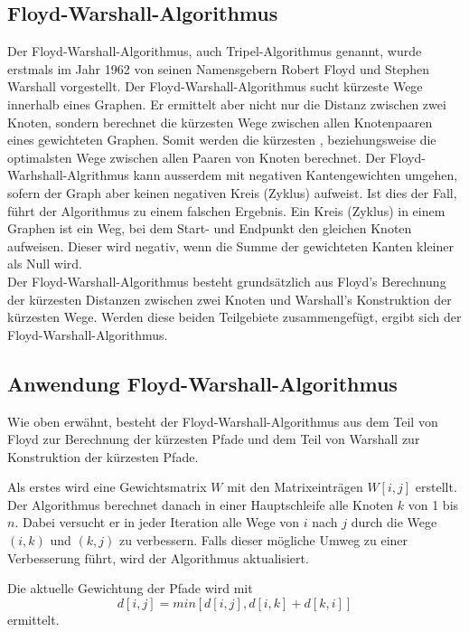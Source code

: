 \subsection{Floyd-Warshall-Algorithmus}
Der Floyd-Warshall-Algorithmus, auch Tripel-Algorithmus genannt, wurde erstmals im Jahr 1962 von seinen Namensgebern Robert Floyd und Stephen Warshall vorgestellt.
Der Floyd-Warshall-Algorithmus sucht kürzeste Wege innerhalb eines Graphen. Er ermittelt aber nicht nur die Distanz zwischen zwei Knoten, sondern berechnet die kürzesten Wege zwischen allen Knotenpaaren eines gewichteten Graphen. Somit werden die kürzesten , beziehungsweise die optimalsten Wege zwischen allen Paaren von Knoten berechnet. Der Floyd-Warhshall-Algrithmus kann ausserdem mit negativen Kantengewichten umgehen, sofern der Graph aber keinen negativen Kreis (Zyklus) aufweist. Ist dies der Fall, führt der Algorithmus zu einem falschen Ergebnis.
Ein Kreis (Zyklus) in einem Graphen ist ein Weg, bei dem Start- und Endpunkt den gleichen Knoten aufweisen. Dieser wird negativ, wenn die Summe der gewichteten Kanten kleiner als Null wird.\\
Der Floyd-Warshall-Algorithmus besteht grundsätzlich aus Floyd's Berechnung der kürzesten Distanzen zwischen zwei Knoten und Warshall's Konstruktion der kürzesten Wege. Werden diese beiden Teilgebiete zusammengefügt, ergibt sich der Floyd-Warshall-Algorithmus.

\subsection{Anwendung Floyd-Warshall-Algorithmus}

Wie oben erwähnt, besteht der Floyd-Warshall-Algorithmus aus dem Teil von Floyd zur Berechnung der kürzesten Pfade und dem Teil von Warshall zur Konstruktion der kürzesten Pfade.

Als erstes wird eine Gewichtsmatrix $W$ mit den Matrixeinträgen $W[i, j]$ erstellt.
Der Algorithmus berechnet danach in einer Hauptschleife alle Knoten $k$ von 1 bis $n$.
Dabei versucht er in jeder Iteration alle Wege von $i$ nach $j$ durch die Wege $(i, k)$ und $(k, j)$ zu verbessern.
Falls dieser mögliche Umweg zu einer Verbesserung führt, wird der Algorithmus aktualisiert.

Die aktuelle Gewichtung der Pfade wird mit
\begin{equation}d[i, j]=min[d[i,j], d[i,k] + d[k,i]]\end{equation}
ermittelt.

